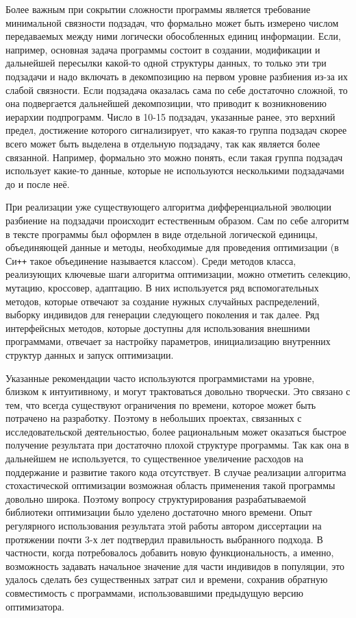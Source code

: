 Более важным при сокрытии сложности программы является требование
минимальной связности подзадач, что формально может быть
измерено числом передаваемых между ними логически обособленных единиц информации.
Если, например, основная задача программы
состоит в создании, модификации и дальнейшей пересылки какой-то одной
структуры данных, то только эти три подзадачи и надо включать в
декомпозицию на первом уровне разбиения из-за их слабой связности. Если
подзадача оказалась сама по себе достаточно сложной, то она
подвергается дальнейшей декомпозиции, что приводит к возникновению
иерархии подпрограмм.  Число в 10-15 подзадач, указанные ранее, это
верхний предел, достижение которого сигнализирует, что какая-то
группа подзадач скорее всего может быть выделена в отдельную подзадачу,
так как является более связанной. Например, формально это можно
понять, если такая группа подзадач использует какие-то данные, которые
не используются несколькими подзадачами до и после неё.

При реализации уже существующего алгоритма дифференциальной эволюции
разбиение на подзадачи происходит естественным образом. Сам по себе
алгоритм в тексте программы был оформлен в виде отдельной логической
единицы, объединяющей  данные и методы, необходимые
для проведения оптимизации (в Си\texttt{++} такое
объединение называется классом). Среди методов класса, реализующих
ключевые шаги алгоритма оптимизации, можно отметить селекцию, мутацию,
кроссовер, адаптацию. В них используется ряд вспомогательных методов,
которые отвечают за создание нужных случайных распределений, выборку
индивидов для генерации следующего поколения и так далее. Ряд
интерфейсных методов, которые доступны для использования внешними
программами, отвечает за настройку параметров,
инициализацию внутренних структур данных и запуск оптимизации.

Указанные рекомендации часто используются программистами на уровне,
близком к интуитивному, и могут трактоваться довольно творчески.  Это
связано с тем, что всегда существуют ограничения по времени, которое
может быть потрачено на разработку. Поэтому в небольших проектах,
связанных с исследовательской деятельностью, более рациональным может
оказаться быстрое получение результата при достаточно плохой структуре
программы. Так как она в дальнейшем не используется, то существенное
увеличение расходов на поддержание и развитие такого кода
отсутствует. В случае реализации алгоритма стохастической оптимизации
возможная область применения такой программы довольно широка. Поэтому
вопросу структурирования разрабатываемой библиотеки оптимизации было
уделено достаточно много времени.  Опыт регулярного использования
результата этой работы автором диссертации на протяжении почти 3-х лет подтвердил
правильность выбранного подхода.  В частности, когда потребовалось
добавить новую функциональность, а именно, возможность задавать
начальное значение для части индивидов в популяции, это удалось
сделать без существенных затрат сил и времени, сохранив обратную
совместимость с программами, использовавшими предыдущую версию
оптимизатора.

